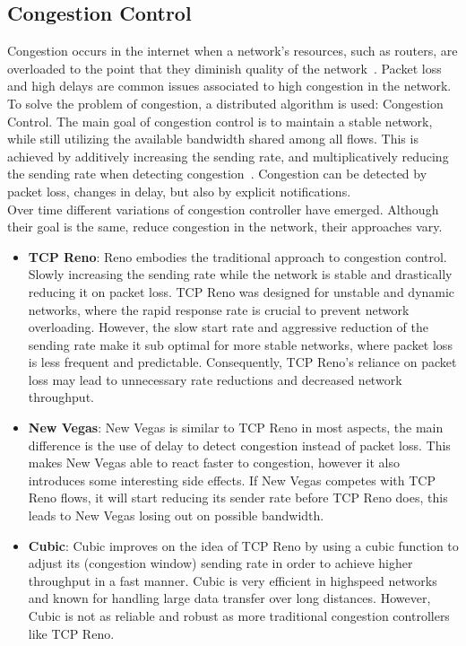 \documentclass[a4paper,english, 11pt]{report}
\begin{document}
\subsection{Congestion Control}
Congestion occurs in the internet when a network's resources, such as routers, are overloaded to the point that they diminish quality of the network~\cite{rfc6077}. Packet loss and high delays are common issues associated to high congestion in the network. To solve the problem of congestion, a distributed algorithm is used: Congestion Control. The main goal of congestion control is to maintain a stable network, while still utilizing the available bandwidth shared among all flows. This is achieved by additively increasing the sending rate, and multiplicatively reducing the sending rate when detecting congestion~\cite{welzl_congestion}. Congestion can be detected by packet loss, changes in delay, but also by explicit notifications.\\

Over time different variations of congestion controller have emerged. Although their goal is the same, reduce congestion in the network, their approaches vary. 

\begin{itemize}
  \item \textbf{TCP Reno}: Reno embodies the traditional approach to congestion control. Slowly increasing the sending rate while the network is stable and drastically reducing it on packet loss. TCP Reno was designed for unstable and dynamic networks, where the rapid response rate is crucial to prevent network overloading. However, the slow start rate and aggressive reduction of the sending rate make it sub optimal for more stable networks, where packet loss is less frequent and predictable. Consequently, TCP Reno's reliance on packet loss may lead to unnecessary rate reductions and decreased network throughput.
  \item \textbf{New Vegas}: New Vegas is similar to TCP Reno in most aspects, the main difference is the use of delay to detect congestion instead of packet loss. This makes New Vegas able to react faster to congestion, however it also introduces some interesting side effects. If New Vegas competes with TCP Reno flows, it will start reducing its sender rate before TCP Reno does, this leads to New Vegas losing out on possible bandwidth. 
  \item \textbf{Cubic}: Cubic improves on the idea of TCP Reno by using a cubic function to adjust its (congestion window) sending rate in order to achieve higher throughput in a fast manner. Cubic is very efficient in highspeed networks and known for handling large data transfer over long distances. However, Cubic is not as reliable and robust as more traditional congestion controllers like TCP Reno.
\end{itemize}
\end{document}
